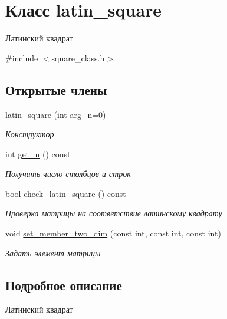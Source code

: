 \hypertarget{classlatin__square}{\section{Класс latin\+\_\+square}
\label{classlatin__square}
}


Латинский квадрат  




{\ttfamily \#include $<$square\+\_\+class.\+h$>$}

\subsection*{Открытые члены}
\begin{DoxyCompactItemize}
\item 
\hyperlink{classlatin__square_a81487748e3511c6bd041f65cf39fa7a5}{latin\+\_\+square} (int arg\+\_\+n=0)
\begin{DoxyCompactList}\small\item\em Конструктор \end{DoxyCompactList}\item 
int \hyperlink{classlatin__square_aba8d702ed0b3bdd27773523c41375d5c}{get\+\_\+n} () const 
\begin{DoxyCompactList}\small\item\em Получить число столбцов и строк \end{DoxyCompactList}\item 
bool \hyperlink{classlatin__square_ae778a9f98bb205738cfa1a86af8089a6}{check\+\_\+latin\+\_\+square} () const 
\begin{DoxyCompactList}\small\item\em Проверка матрицы на соответствие латинскому квадрату \end{DoxyCompactList}\item 
\hypertarget{classlatin__square_af8886737b3fdcabe0734da60d5a2553a}{void \hyperlink{classlatin__square_af8886737b3fdcabe0734da60d5a2553a}{set\+\_\+member\+\_\+two\+\_\+dim} (const int, const int, const int)}\label{classlatin__square_af8886737b3fdcabe0734da60d5a2553a}

\begin{DoxyCompactList}\small\item\em Задать элемент матрицы \end{DoxyCompactList}\end{DoxyCompactItemize}


\subsection{Подробное описание}
Латинский квадрат 

